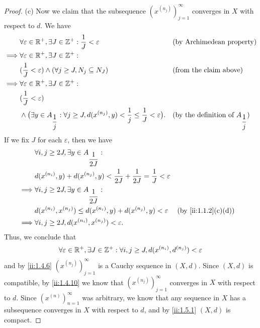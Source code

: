 \begin{proof}{(c)}
  Now we claim that the subsequence \((x^{(n_j)})_{j = 1}^\infty\) converges in \(X\) with respect to \(d\).
  We have
  \begin{align*}
             & \forall \varepsilon \in \mathbb{R}^+, \exists J \in \mathbb{Z}^+ : \dfrac{1}{J} < \varepsilon                                                      &  & \text{(by Archimedean property)}                   \\
    \implies & \forall \varepsilon \in \mathbb{R}^+, \exists J \in \mathbb{Z}^+ :                                                                                                                                         \\
             & (\dfrac{1}{J} < \varepsilon) \land (\forall j \geq J, N_j \subseteq N_J)                                                           &  & \text{(from the claim above)}                      \\
    \implies & \forall \varepsilon \in \mathbb{R}^+, \exists J \in \mathbb{Z}^+ :                                                                                                                                         \\
             & (\dfrac{1}{J} < \varepsilon)                                                                                                                                                               \\
             & \land \big(\exists y \in A_{\dfrac{1}{j}} : \forall j \geq J, d(x^{(n_j)}, y) < \dfrac{1}{j} \leq \dfrac{1}{J} < \varepsilon\big). &  & \text{(by the definition of \(A_{\dfrac{1}{j}}\))}
  \end{align*}
  If we fix \(J\) for each \(\varepsilon\), then we have
  \begin{align*}
             & \forall i, j \geq 2J, \exists y \in A_{\dfrac{1}{2J}} :                                                                \\
             & d(x^{(n_i)}, y) + d(x^{(n_j)}, y) < \dfrac{1}{2J} + \dfrac{1}{2J} = \dfrac{1}{J} < \varepsilon                         \\
    \implies & \forall i, j \geq 2J, \exists y \in A_{\dfrac{1}{2J}} :                                                                \\
             & d(x^{(n_i)}, x^{(n_j)}) \leq d(x^{(n_i)}, y) + d(x^{(n_j)}, y) < \varepsilon                   &  & \by{ii:1.1.2}[c,d] \\
    \implies & \forall i, j \geq 2J, d(x^{(n_i)}, x^{(n_j)}) < \varepsilon.
  \end{align*}
  Thus, we conclude that
  \[
    \forall \varepsilon \in \mathbb{R}^+, \exists J \in \mathbb{Z}^+ : \forall i, j \geq J, d(x^{(n_i)}, d^{(n_j)}) < \varepsilon
  \]
  and by \cref{ii:1.4.6} \((x^{(n_j)})_{j = 1}^\infty\) is a Cauchy sequence in \((X, d)\).
  Since \((X, d)\) is compatible, by \cref{ii:1.4.10} we know that \((x^{(n_j)})_{j = 1}^\infty\) converges in \(X\) with respect to \(d\).
  Since \((x^{(n)})_{n = 1}^\infty\) was arbitrary, we know that any sequence in \(X\) has a subsequence converges in \(X\) with respect to \(d\), and by \cref{ii:1.5.1} \((X, d)\) is compact.
\end{proof}

